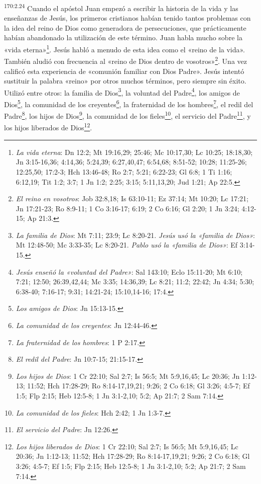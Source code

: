 \par 
\textsuperscript{170:2.24} Cuando el apóstol Juan empezó a escribir la historia de la vida y las enseñanzas de Jesús, los primeros cristianos habían tenido tantos problemas con la idea del reino de Dios como generadora de persecuciones, que prácticamente habían abandonado la utilización de este término. Juan habla mucho sobre la «vida eterna»\footnote{\textit{La vida eterna}: Dn 12:2; Mt 19:16,29; 25:46; Mc 10:17,30; Lc 10:25; 18:18,30; Jn 3:15-16,36; 4:14,36; 5:24,39; 6:27,40,47; 6:54,68; 8:51-52; 10:28; 11:25-26; 12:25,50; 17:2-3; Hch 13:46-48; Ro 2:7; 5:21; 6:22-23; Gl 6:8; 1 Ti 1:16; 6:12,19; Tit 1:2; 3:7; 1 Jn 1:2; 2:25; 3:15; 5:11,13,20; Jud 1:21; Ap 22:5.}. Jesús habló a menudo de esta idea como el «reino de la vida». También aludió con frecuencia al «reino de Dios dentro de vosotros»\footnote{\textit{El reino en vosotros}: Job 32:8,18; Is 63:10-11; Ez 37:14; Mt 10:20; Lc 17:21; Jn 17:21-23; Ro 8:9-11; 1 Co 3:16-17; 6:19; 2 Co 6:16; Gl 2:20; 1 Jn 3:24; 4:12-15; Ap 21:3.}. Una vez calificó esta experiencia de «comunión familiar con Dios Padre». Jesús intentó sustituir la palabra «reino» por otros muchos términos, pero siempre sin éxito. Utilizó entre otros: la familia de Dios\footnote{\textit{La familia de Dios}: Mt 7:11; 23:9; Lc 8:20-21. \textit{Jesús usó la «familia de Dios»}: Mt 12:48-50; Mc 3:33-35; Lc 8:20-21. \textit{Pablo usó la «familia de Dios»}: Ef 3:14-15.}, la voluntad del Padre\footnote{\textit{Jesús enseñó la «voluntad del Padre»}: Sal 143:10; Eclo 15:11-20; Mt 6:10; 7:21; 12:50; 26:39,42,44; Mc 3:35; 14:36,39; Lc 8:21; 11:2; 22:42; Jn 4:34; 5:30; 6:38-40; 7:16-17; 9:31; 14:21-24; 15:10,14-16; 17:4.}, los amigos de Dios\footnote{\textit{Los amigos de Dios}: Jn 15:13-15.}, la comunidad de los creyentes\footnote{\textit{La comunidad de los creyentes}: Jn 12:44-46.}, la fraternidad de los hombres\footnote{\textit{La fraternidad de los hombres}: 1 P 2:17.}, el redil del Padre\footnote{\textit{El redil del Padre}: Jn 10:7-15; 21:15-17.}, los hijos de Dios\footnote{\textit{Los hijos de Dios}: 1 Cr 22:10; Sal 2:7; Is 56:5; Mt 5:9,16,45; Lc 20:36; Jn 1:12-13; 11:52; Hch 17:28-29; Ro 8:14-17,19,21; 9:26; 2 Co 6:18; Gl 3:26; 4:5-7; Ef 1:5; Flp 2:15; Heb 12:5-8; 1 Jn 3:1-2,10; 5:2; Ap 21:7; 2 Sam 7:14.}, la comunidad de los fieles\footnote{\textit{La comunidad de los fieles}: Hch 2:42; 1 Jn 1:3-7.}, el servicio del Padre\footnote{\textit{El servicio del Padre}: Jn 12:26.}, y los hijos liberados de Dios\footnote{\textit{Los hijos liberados de Dios}: 1 Cr 22:10; Sal 2:7; Is 56:5; Mt 5:9,16,45; Lc 20:36; Jn 1:12-13; 11:52; Hch 17:28-29; Ro 8:14-17,19,21; 9:26; 2 Co 6:18; Gl 3:26; 4:5-7; Ef 1:5; Flp 2:15; Heb 12:5-8; 1 Jn 3:1-2,10; 5:2; Ap 21:7; 2 Sam 7:14.}.


